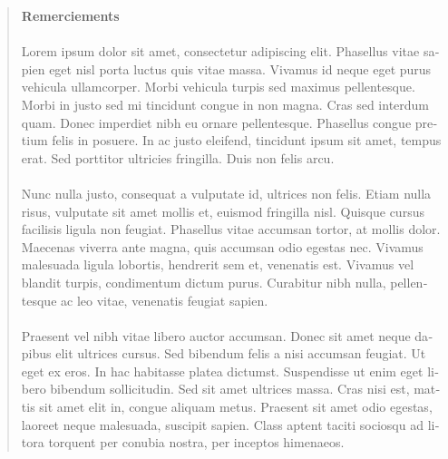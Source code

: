 \cleardoublepage{}

\thispagestyle{plain}

\hspace{3cm}

\begin{quote}

\begin{otherlanguage}{french}

\begin{center}
  \textbf{Remerciements}
\end{center}


\paragraph{}
Lorem ipsum dolor sit amet, consectetur adipiscing elit. Phasellus vitae sapien eget nisl porta luctus quis vitae massa. Vivamus id neque eget purus vehicula ullamcorper. Morbi vehicula turpis sed maximus pellentesque. Morbi in justo sed mi tincidunt congue in non magna. Cras sed interdum quam. Donec imperdiet nibh eu ornare pellentesque. Phasellus congue pretium felis in posuere. In ac justo eleifend, tincidunt ipsum sit amet, tempus erat. Sed porttitor ultricies fringilla. Duis non felis arcu.

\paragraph{}
Nunc nulla justo, consequat a vulputate id, ultrices non felis. Etiam nulla risus, vulputate sit amet mollis et, euismod fringilla nisl. Quisque cursus facilisis ligula non feugiat. Phasellus vitae accumsan tortor, at mollis dolor. Maecenas viverra ante magna, quis accumsan odio egestas nec. Vivamus malesuada ligula lobortis, hendrerit sem et, venenatis est. Vivamus vel blandit turpis, condimentum dictum purus. Curabitur nibh nulla, pellentesque ac leo vitae, venenatis feugiat sapien.

\paragraph{}
Praesent vel nibh vitae libero auctor accumsan. Donec sit amet neque dapibus elit ultrices cursus. Sed bibendum felis a nisi accumsan feugiat. Ut eget ex eros. In hac habitasse platea dictumst. Suspendisse ut enim eget libero bibendum sollicitudin. Sed sit amet ultrices massa. Cras nisi est, mattis sit amet elit in, congue aliquam metus. Praesent sit amet odio egestas, laoreet neque malesuada, suscipit sapien. Class aptent taciti sociosqu ad litora torquent per conubia nostra, per inceptos himenaeos.

\end{otherlanguage}

\end{quote}
